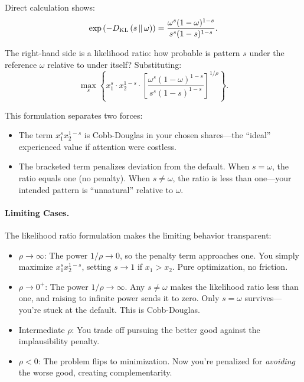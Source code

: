 Direct calculation shows:
\begin{equation}
\label{eq:kl-likelihood}
\exp\left(-D_{\mathrm{KL}}\left(s \,\|\, \omega\right)\right) = \frac{\omega^s(1-\omega)^{1-s}}{s^s(1-s)^{1-s}}.
\end{equation}

The right-hand side is a likelihood ratio: how probable is pattern $s$ under the reference $\omega$ relative to under itself? Substituting:
\begin{equation}
\label{eq:attention-likelihood}
\max_s \left\{ x_1^s \cdot x_2^{1-s} \cdot \left[\frac{\omega^s(1-\omega)^{1-s}}{s^s(1-s)^{1-s}}\right]^{1/\rho} \right\}.
\end{equation}

This formulation separates two forces:
\begin{itemize}[nosep]
    \item The term $x_1^s x_2^{1-s}$ is Cobb-Douglas in your chosen shares---the ``ideal'' experienced value if attention were costless.
    \item The bracketed term penalizes deviation from the default. When $s = \omega$, the ratio equals one (no penalty). When $s \neq \omega$, the ratio is less than one---your intended pattern is ``unnatural'' relative to $\omega$.
\end{itemize}

\paragraph{Limiting Cases.}

The likelihood ratio formulation makes the limiting behavior transparent:
\begin{itemize}[nosep]
    \item $\rho \to \infty$: The power $1/\rho \to 0$, so the penalty term approaches one. You simply maximize $x_1^s x_2^{1-s}$, setting $s \to 1$ if $x_1 > x_2$. Pure optimization, no friction.
    \item $\rho \to 0^+$: The power $1/\rho \to \infty$. Any $s \neq \omega$ makes the likelihood ratio less than one, and raising to infinite power sends it to zero. Only $s = \omega$ survives---you're stuck at the default. This is Cobb-Douglas.
    \item Intermediate $\rho$: You trade off pursuing the better good against the implausibility penalty.
    \item $\rho < 0$: The problem flips to minimization. Now you're penalized for \emph{avoiding} the worse good, creating complementarity.
\end{itemize}

